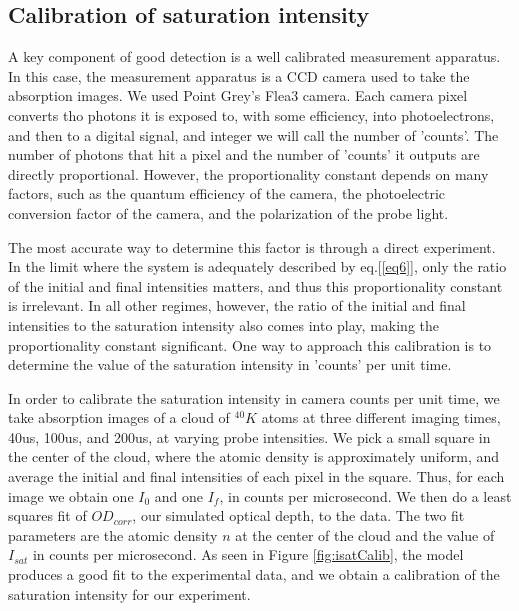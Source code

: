 \documentclass[12pt]{iopart}
\begin{document}
\subsection{Calibration of saturation intensity}
A key component of good detection is a well calibrated measurement apparatus. In this case, the measurement apparatus is a CCD camera used to take the absorption images. We used Point Grey's Flea3 camera.  Each camera pixel  converts tho photons it is exposed to, with some efficiency, into photoelectrons, and then to a digital signal, and integer we will call the number of 'counts'. The number of photons that hit a pixel and the number of 'counts' it outputs are directly proportional. However, the proportionality constant depends on many factors, such as the quantum efficiency of the camera, the photoelectric conversion factor of the camera, and the polarization of the probe light. 
\par The most accurate way to determine this factor is through a direct experiment. In the limit where the system is adequately described by eq.[\ref{eq6}], only the ratio of the initial and final intensities matters, and thus this proportionality constant is irrelevant. In all other regimes, however, the ratio of the initial and final intensities to the saturation intensity also comes into play, making the proportionality constant significant. One way to approach this calibration is to determine the value of the saturation intensity in 'counts' per unit time. 
\par In order to calibrate the saturation intensity in camera counts per unit time, we take absorption images of a cloud of $^{40}K$ atoms at three different imaging times, 40us, 100us, and 200us, at varying probe intensities. We pick a small square in the center of the cloud, where the atomic density is approximately uniform, and average the initial and final intensities of each pixel in the square. Thus, for each image we obtain one $I_0$ and one $I_f$, in counts per microsecond. We then do a least squares fit of $OD_{corr}$, our simulated optical depth, to the data. The two fit parameters are the atomic density $n$ at the center of the cloud and the value of $I_{sat}$ in counts per microsecond. As seen in Figure \ref{fig:isatCalib}, the model produces a good fit to the experimental data, and we obtain a calibration of the saturation intensity for our experiment. 
\end{document}
